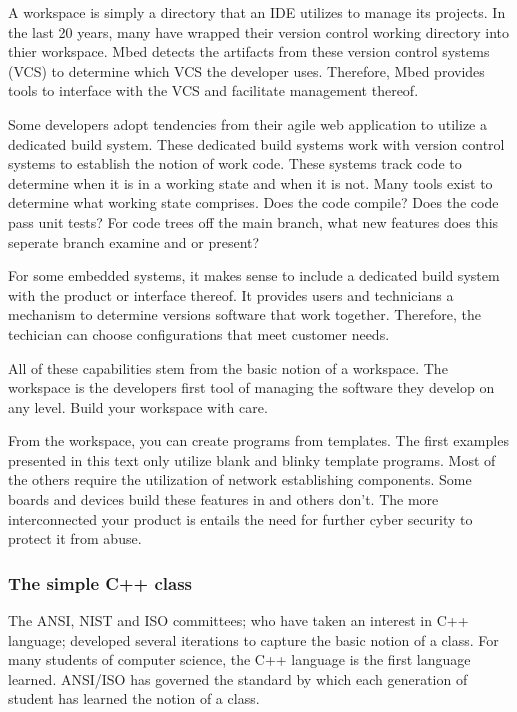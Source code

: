 \documentclass{article}
\begin{document}
A workspace is simply a directory that an IDE utilizes to manage its projects.  In the last 20 years, many have wrapped their version control working directory into thier workspace.  Mbed detects the artifacts from these version control systems (VCS) to determine which VCS the developer uses. Therefore, Mbed provides tools to interface with the VCS and facilitate management thereof.  

Some developers adopt tendencies from their agile web application to utilize a dedicated build system.  These dedicated build systems work with version control systems to establish the notion of work code.  These systems track code to determine when it is in a working state and when it is not.  Many tools exist to determine what working state comprises.  Does the code compile?  Does the code pass unit tests?  For code trees off the main branch, what new features does this seperate branch examine and or present?

For some embedded systems, it makes sense to include a dedicated build system with the product or interface thereof.  It provides users and technicians a mechanism to determine versions software that work together.  Therefore, the techician can choose configurations that meet customer needs.

All of these capabilities stem from the basic notion of a workspace.  The workspace is the developers first tool of managing the software they develop on any level.  Build your workspace with care.

From the workspace, you can create programs from templates.  The first examples presented in this text only utilize blank and blinky template programs.  Most of the others require the utilization of network establishing components.  Some boards and devices build these features in and others don't.  The more interconnected your product is entails the need for further cyber security to protect it from abuse.


\subsubsection{The simple C++ class} %
\label{ssub:the_simple_c_class}

The ANSI, NIST and ISO committees; who have taken an interest in C++ language; developed several iterations to capture the basic notion of a class.  For many students of computer science, the C++ language is the first language learned.  ANSI/ISO has governed the standard by which each generation of student has learned the notion of a class.
\end{document}
